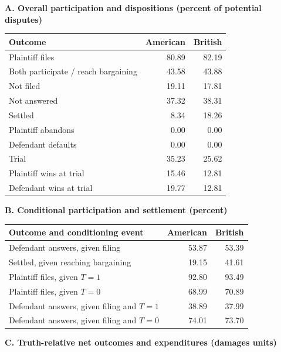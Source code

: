 \begingroup
\small
\setlength{\tabcolsep}{5pt}
\renewcommand{\arraystretch}{1.20}
\noindent\textbf{A. Overall participation and dispositions (percent of potential disputes)}\par\smallskip
\noindent\begin{tabularx}{\linewidth}{@{}>{\raggedright\arraybackslash}Xrr@{}}
\toprule
\textbf{Outcome} & \textbf{American} & \textbf{British} \\
\midrule
Plaintiff files & 80.89 & 82.19 \\
Both participate / reach bargaining & 43.58 & 43.88 \\
Not filed & 19.11 & 17.81 \\
Not answered & 37.32 & 38.31 \\
Settled & 8.34 & 18.26 \\
Plaintiff abandons & 0.00 & 0.00 \\
Defendant defaults & 0.00 & 0.00 \\
Trial & 35.23 & 25.62 \\
Plaintiff wins at trial & 15.46 & 12.81 \\
Defendant wins at trial & 19.77 & 12.81 \\
\bottomrule\end{tabularx}\par\medskip
\noindent\textbf{B. Conditional participation and settlement (percent)}\par\smallskip
\noindent\begin{tabularx}{\linewidth}{@{}>{\raggedright\arraybackslash}Xrr@{}}
\toprule
\textbf{Outcome and conditioning event} & \textbf{American} & \textbf{British} \\
\midrule
Defendant answers, given filing & 53.87 & 53.39 \\
Settled, given reaching bargaining & 19.15 & 41.61 \\
Plaintiff files, given $T=1$ & 92.80 & 93.49 \\
Plaintiff files, given $T=0$ & 68.99 & 70.89 \\
Defendant answers, given filing and $T=1$ & 38.89 & 37.99 \\
Defendant answers, given filing and $T=0$ & 74.01 & 73.70 \\
\bottomrule\end{tabularx}\par\medskip
\noindent\textbf{C. Truth-relative net outcomes and expenditures (damages units)}\par\smallskip
